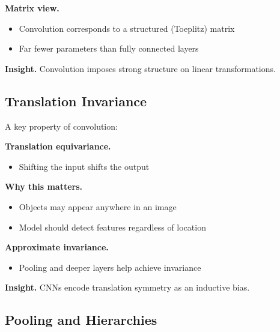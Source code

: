 \medskip

\noindent
\textbf{Matrix view.}

\begin{itemize}
    \item Convolution corresponds to a structured (Toeplitz) matrix
    \item Far fewer parameters than fully connected layers
\end{itemize}

\medskip

\noindent
\textbf{Insight.}  
Convolution imposes strong structure on linear transformations.

\subsection{Translation Invariance}

A key property of convolution:

\medskip

\noindent
\textbf{Translation equivariance.}

\begin{itemize}
    \item Shifting the input shifts the output
\end{itemize}

\medskip

\noindent
\textbf{Why this matters.}

\begin{itemize}
    \item Objects may appear anywhere in an image
    \item Model should detect features regardless of location
\end{itemize}

\medskip

\noindent
\textbf{Approximate invariance.}

\begin{itemize}
    \item Pooling and deeper layers help achieve invariance
\end{itemize}

\medskip

\noindent
\textbf{Insight.}  
CNNs encode translation symmetry as an inductive bias.

\subsection{Pooling and Hierarchies}

